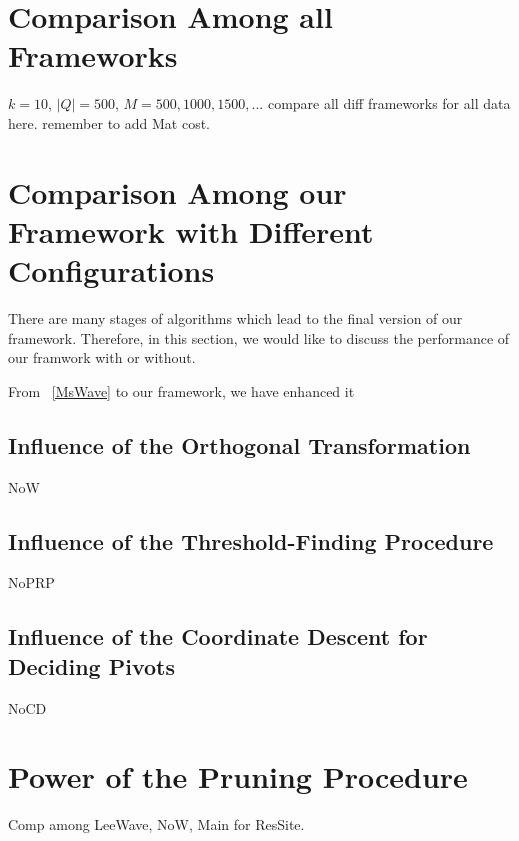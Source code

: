 \section{Comparison Among all Frameworks} %
\label{s:comparison_among_all_frameworks}

$k=10$, $|Q|=500$, $M=500,1000,1500,...$
compare all diff frameworks for all data here. remember to add Mat cost.


\section{Comparison Among our Framework with Different Configurations} %
\label{s:comparison_among_our_framework_with_different_configurations}

There are many stages of algorithms which lead to the final version of our framework.  Therefore, in this section, we would like to discuss the performance of our framwork with or without.

From ~\ref{MsWave} to our framework, we have enhanced it


\subsection{Influence of the Orthogonal Transformation} %
\label{ss:influence_of_the_orthogonal_transformation}

NoW

\subsection{Influence of the Threshold-Finding Procedure} %
\label{sub:influence_of_the_threshold_finding_procedure}

NoPRP

\subsection{Influence of the Coordinate Descent for Deciding Pivots} %
\label{sub:influence_of_the_decision_of_pivots}

NoCD


\section{Power of the Pruning Procedure} %
\label{s:power_of_the_pruning_procedure}

Comp among LeeWave, NoW, Main for ResSite.




%
%
